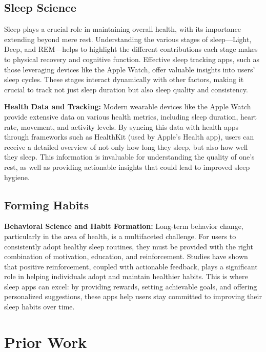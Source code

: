 \documentclass[10pt,twocolumn]{article}
\begin{document}
\subsection{Sleep Science}

Sleep plays a crucial role in maintaining overall health, with its importance extending beyond mere rest. Understanding the various stages of sleep—Light, Deep, and REM\cite{sleep-stages}—helps to highlight the different contributions each stage makes to physical recovery and cognitive function. Effective sleep tracking apps, such as those leveraging devices like the Apple Watch, offer valuable insights into users' sleep cycles. These stages interact dynamically with other factors, making it crucial to track not just sleep duration but also sleep quality and consistency.

\textbf{Health Data and Tracking:} Modern wearable devices like the Apple Watch provide extensive data on various health metrics, including sleep duration, heart rate, movement, and activity levels\cite{digital-sleep-technologies}. By syncing this data with health apps through frameworks such as HealthKit (used by Apple's Health app), users can receive a detailed overview of not only how long they sleep, but also how well they sleep. This information is invaluable for understanding the quality of one's rest, as well as providing actionable insights that could lead to improved sleep hygiene.

\subsection{Forming Habits}

\textbf{Behavioral Science and Habit Formation:} Long-term behavior change, particularly in the area of health, is a multifaceted challenge. For users to consistently adopt healthy sleep routines, they must be provided with the right combination of motivation\cite{positive-reinforcement}, education, and reinforcement. Studies have shown that positive reinforcement, coupled with actionable feedback, plays a significant role in helping individuals adopt and maintain healthier habits. This is where sleep apps can excel: by providing rewards\cite{positive-reinforcement}, setting achievable goals, and offering personalized suggestions, these apps help users stay committed to improving their sleep habits over time.

\section{Prior Work}
\end{document}
